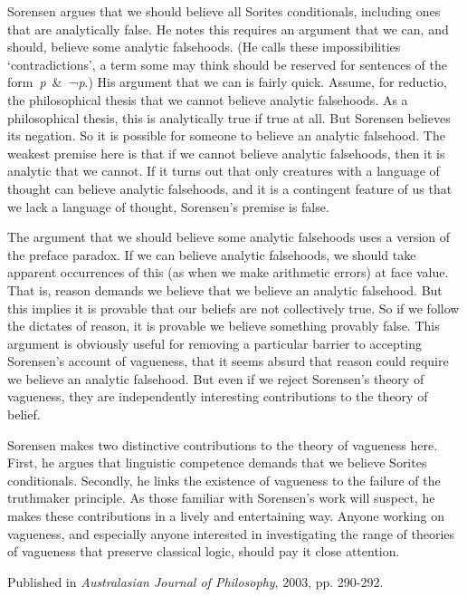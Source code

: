 \documentclass[
  10pt,
  letterpaper,
  DIV=11,
  numbers=noendperiod,
  twoside]{scrartcl}
\begin{document}
Sorensen argues that we should believe all Sorites conditionals,
including ones that are analytically false. He notes this requires an
argument that we can, and should, believe some analytic falsehoods. (He
calls these impossibilities `contradictions', a term some may think
should be reserved for sentences of the form~\emph{p}~\&~¬\emph{p}.) His
argument that we can is fairly quick. Assume, for reductio, the
philosophical thesis that we cannot believe analytic falsehoods. As a
philosophical thesis, this is analytically true if true at all. But
Sorensen believes its negation. So it is possible for someone to believe
an analytic falsehood. The weakest premise here is that if we cannot
believe analytic falsehoods, then it is analytic that we cannot. If it
turns out that only creatures with a language of thought can believe
analytic falsehoods, and it is a contingent feature of us that we lack a
language of thought, Sorensen's premise is false.

The argument that we should believe some analytic falsehoods uses a
version of the preface paradox. If we can believe analytic falsehoods,
we should take apparent occurrences of this (as when we make arithmetic
errors) at face value. That is, reason demands we believe that we
believe an analytic falsehood. But this implies it is provable that our
beliefs are not collectively true. So if we follow the dictates of
reason, it is provable we believe something provably false. This
argument is obviously useful for removing a particular barrier to
accepting Sorensen's account of vagueness, that it seems absurd that
reason could require we believe an analytic falsehood. But even if we
reject Sorensen's theory of vagueness, they are independently
interesting contributions to the theory of belief.

Sorensen makes two distinctive contributions to the theory of vagueness
here. First, he argues that linguistic competence demands that we
believe Sorites conditionals. Secondly, he links the existence of
vagueness to the failure of the truthmaker principle. As those familiar
with Sorensen's work will suspect, he makes these contributions in a
lively and entertaining way. Anyone working on vagueness, and especially
anyone interested in investigating the range of theories of vagueness
that preserve classical logic, should pay it close attention.

\vspace{1cm}



\noindent Published in\emph{
Australasian Journal of Philosophy}, 2003, pp. 290-292.
\end{document}
